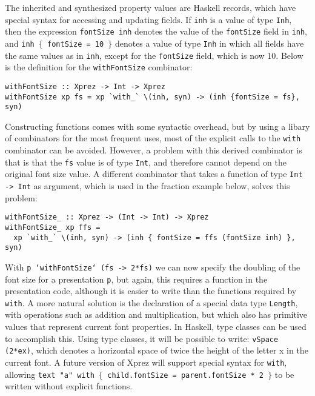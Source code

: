 The inherited and synthesized property values are Haskell records, which have special syntax for accessing and updating fields. If \texttt{inh} is a value of type \texttt{Inh}, then the expression \texttt{fontSize inh} denotes the value of the \texttt{fontSize} field in \texttt{inh}, and \texttt{inh $\{$ fontSize = 10 $\}$} denotes a value of type \texttt{Inh} in which all fields have the same values as in \texttt{inh}, except for the \texttt{fontSize} field, which is now 10. Below is the definition for the \texttt{withFontSize} combinator: 

\begin{small}
\begin{verbatim}
withFontSize :: Xprez -> Int -> Xprez
withFontSize xp fs = xp `with_` \(inh, syn) -> (inh {fontSize = fs}, syn)
\end{verbatim}
\end{small}

Constructing functions comes with some syntactic overhead, but by using a libary of combinators for the most frequent uses, most of the explicit calls to the \texttt{with} combinator can be avoided. However, a problem with this derived combinator is that is that the \texttt{fs} value is of type \texttt{Int}, and therefore cannot depend on the original font size value. A different combinator that takes a function of type \texttt{Int -> Int} as argument, which is used in the fraction example below, solves this problem:

\begin{small}
\begin{verbatim}
withFontSize_ :: Xprez -> (Int -> Int) -> Xprez
withFontSize_ xp ffs = 
  xp `with_` \(inh, syn) -> (inh { fontSize = ffs (fontSize inh) }, syn)
\end{verbatim}
\end{small}


With \texttt{p `withFontSize` (fs -> 2*fs)} we can now specify the doubling of the font size for a presentation \texttt{p}, but again, this requires a function in the presentation code, although it is easier to write than the functions required by \texttt{with}. A more natural solution is the declaration of a special data type \texttt{Length}, with operations such as addition and multiplication, but which also has primitive values that represent current font properties. In Haskell, type classes can be used to accomplish this. Using type classes, it will be possible to write: \texttt{vSpace (2*ex)}, which denotes a horizontal space of twice the height of the letter x in the current font. A future version of {\sc Xprez} will support special syntax for \texttt{with}, allowing \texttt{text "a" with $\{$ child.fontSize = parent.fontSize * 2 $\}$} to be written without explicit functions.


